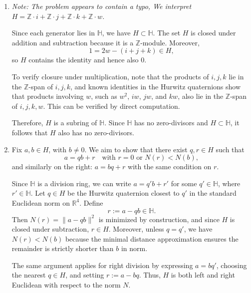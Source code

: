 \documentclass[12pt]{article}
\begin{document}
\begin{enumerate}[label=(\arabic*)]
    Suppose \( x, y \in \mathbb{H} \) with \( x \ne 0 \) and \( xy = 0 \). Then, \(x^{-1}(xy) = (x^{-1}x)y = 1 \cdot y = y = 0.\)
    Thus, \( y = 0 \), and similarly one shows that \( x = 0 \) if \( y \ne 0 \) and \( xy = 0 \). Therefore, \( \mathbb{H} \) has no zero-divisors, and every nonzero element is invertible. 

    \item
    \textit{Note: The problem appears to contain a typo, We interpret \( H = \mathbb{Z} \cdot i + \mathbb{Z} \cdot j +  \mathbb{Z} \cdot k + \mathbb{Z} \cdot w \).}

    Since each generator lies in \( \mathbb{H} \), we have \( H \subset \mathbb{H} \). The set \( H \) is closed under addition and subtraction because it is a \( \mathbb{Z} \)-module. Moreover,
    \[
    1 = 2w - (i + j + k) \in H,
    \]
    so \( H \) contains the identity and hence also \( 0 \).

    To verify closure under multiplication, note that the products of \( i, j, k \) lie in the \( \mathbb{Z} \)-span of \( i, j, k \), and known identities in the Hurwitz quaternions show that products involving \( w \), such as \( w^2 \), \( iw \), \( jw \), and \( kw \), also lie in the \( \mathbb{Z} \)-span of \( i, j, k, w \). This can be verified by direct computation.

    Therefore, \( H \) is a subring of \( \mathbb{H} \). Since \( \mathbb{H} \) has no zero-divisors and \( H \subset \mathbb{H} \), it follows that \( H \) also has no zero-divisors.
    
    \item
    Fix \( a, b \in H \), with \( b \ne 0 \). We aim to show that there exist \( q, r \in H \) such that
    \[
    a = qb + r \quad \text{with } r = 0 \text{ or } N(r) < N(b),
    \]
    and similarly on the right: \( a = bq + r \) with the same condition on \( r \).

    Since \( \mathbb{H} \) is a division ring, we can write \( a = q'b + r' \) for some \( q' \in \mathbb{H} \), where \( r' \in \mathbb{H} \). Let \( q \in H \) be the Hurwitz quaternion closest to \( q' \) in the standard Euclidean norm on \( \mathbb{R}^4 \). Define
    \[
    r := a - qb \in \mathbb{H}.
    \]
    Then \( N(r) = \|a - qb\|^2 \) is minimized by construction, and since \( H \) is closed under subtraction, \( r \in H \). Moreover, unless \( q = q' \), we have \( N(r) < N(b) \) because the minimal distance approximation ensures the remainder is strictly shorter than \( b \) in norm.

    The same argument applies for right division by expressing \( a = bq' \), choosing the nearest \( q \in H \), and setting \( r := a - bq \). Thus, \( H \) is both left and right Euclidean with respect to the norm \( N \).

\end{enumerate}
\end{document}
